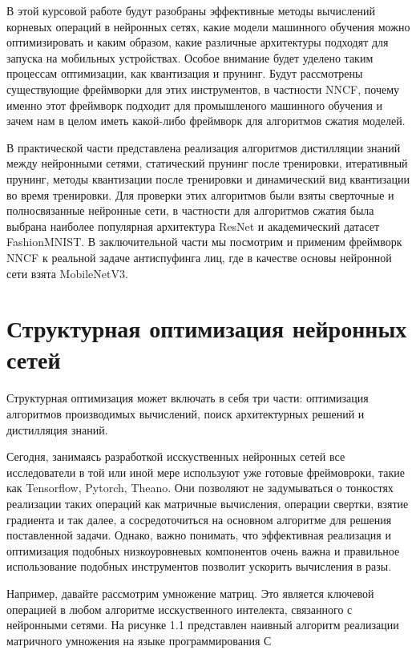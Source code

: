 \documentclass[oneside,final,12pt]{extreport}
\begin{document}
В этой курсовой работе будут разобраны эффективные методы вычислений корневых операций в нейронных сетях, какие модели машинного обучения можно оптимизировать и каким образом, какие различные архитектуры подходят для запуска на мобильных устройствах. Особое внимание будет уделено таким процессам оптимизации, как квантизация и прунинг. Будут рассмотрены существующие фреймворки для этих инструментов, в частности NNCF, почему именно этот фреймворк подходит для промышленого машинного обучения и зачем нам в целом иметь какой-либо фреймворк для алгоритмов сжатия моделей.

В практической части представлена реализация алгоритмов дистилляции знаний между нейронными сетями, статический прунинг после тренировки, итеративный прунинг, методы квантизации после тренировки и динамический вид квантизации во время тренировки. Для проверки этих алгоритмов были взяты сверточные и полносвязанные нейронные сети, в частности для алгоритмов сжатия была выбрана наиболее популярная архитектура ResNet и академический датасет FashionMNIST. В заключительной части мы посмотрим и применим фреймворк NNCF к реальной задаче антиспуфинга лиц, где в качестве основы нейронной сети взята MobileNetV3.

\chapter{Структурная оптимизация нейронных сетей}
Структурная оптимизация может включать в себя три части: оптимизация алгоритмов производимых вычислений, поиск архитектурных решений и дистилляция знаний. 

Сегодня, занимаясь разработкой исскуственных нейронных сетей все исследователи в той или иной мере используют уже готовые фреймовроки, такие как Tensorflow, Pytorch, Theano. Они позволяют не задумываться о тонкостях реализации таких операций как матричные вычисления, операции свертки, взятие градиента и так далее, а сосредоточиться на основном алгоритме для решения поставленной задачи. Однако, важно понимать, что эффективная реализация и оптимизация подобных низкоуровневых компонентов очень важна и правильное использование подобных инструментов позволит ускорить вычисления в разы. 

Например, давайте рассмотрим умножение матриц. Это является ключевой операцией в любом алгоритме исскуственного интелекта, связанного с нейронными сетями. На рисунке 1.1 представлен наивный алгоритм реализации матричного умножения на языке программирования С
\end{document}
